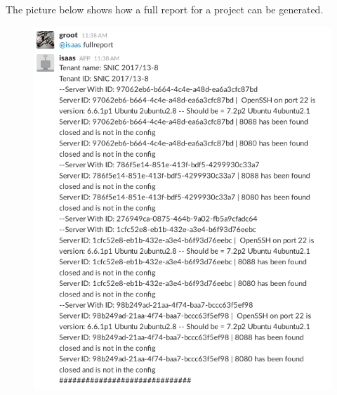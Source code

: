 \documentclass[12pt]{article}
\begin{document}
\newpage
The picture below shows how a full report for a project can be generated.
\begin{figure}[H]
    \begin{mdframed}
    \includegraphics[scale=.5]{./pic/2017-06-26-113829_608x740_scrot.png}
    \end{mdframed}
\end{figure}
\end{document}
